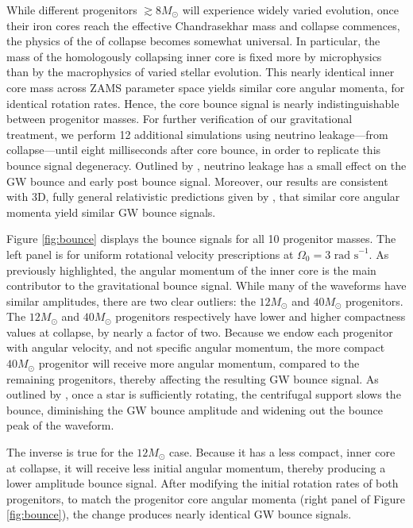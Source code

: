 \documentclass[twocolumn,times]{aastex62}  %
\begin{document}
While different progenitors $\gtrsim 8 M_\odot$ will experience widely varied evolution, once their iron cores reach the effective Chandrasekhar mass \citep{baron:1990} and collapse commences, the physics of the of collapse becomes somewhat universal.
In particular, the mass of the homologously collapsing inner core is fixed more by microphysics than by the macrophysics of varied stellar evolution. 
This nearly identical inner core mass across ZAMS parameter space yields similar core angular momenta, for identical rotation rates.  Hence, the core bounce signal is nearly indistinguishable between progenitor masses.  For further verification of our gravitational treatment, we perform 12 additional simulations using neutrino leakage---from collapse---until eight milliseconds after core bounce, in order to replicate this bounce signal degeneracy.  Outlined by \citet{ott:2012}, neutrino leakage has a small effect on the GW bounce and early post bounce signal.  
Moreover, our results are consistent with 3D, fully general relativistic predictions given by \citet{ott:2012}, that similar core angular momenta yield similar GW bounce signals.  

Figure \ref{fig:bounce} displays the bounce signals for all 10 progenitor masses.  The left panel is for uniform rotational velocity prescriptions at $\Omega_0 = 3\text{ rad s}^{-1}$.  As previously highlighted, the angular momentum of the inner core is the main contributor to the gravitational bounce signal.  While many of the waveforms have similar amplitudes, there are two clear outliers: the $12 M_\odot$ and $40 M_\odot$ progenitors.  The $12 M_\odot$ and $40 M_\odot$ progenitors respectively have lower and higher compactness values at collapse, by nearly a factor of two.  Because we endow each progenitor with angular velocity, and not specific angular momentum, the more compact $40 M_\odot$ progenitor will receive more angular momentum, compared to the remaining progenitors, thereby affecting the resulting GW bounce signal.  As outlined by \citet{dimm:2008}, once a star is sufficiently rotating, the centrifugal support slows the bounce, diminishing the GW bounce amplitude and widening out the bounce peak of the waveform.  

The inverse is true for the $12 M_\odot$ case.  Because it has a less compact, inner core at collapse, it will receive less initial angular momentum, thereby producing a lower amplitude bounce signal.  After modifying the initial rotation rates of both progenitors, to match the progenitor core angular momenta (right panel of Figure \ref{fig:bounce}), the change produces nearly identical GW bounce signals.  
\end{document}
